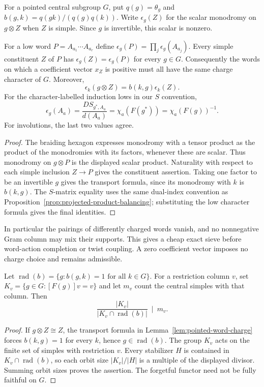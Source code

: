For a pointed central subgroup $G$, put $q(g)=\theta_g$ and
$b(g,k)=q(gk)/(q(g)q(k))$. Write $\epsilon_g(Z)$ for the scalar
monodromy on $g\otimes Z$ when $Z$ is simple. Since $g$ is invertible,
this scalar is nonzero.

\begin{lemma}
\label{lem:pointed-word-charge}
For a low word $P=A_{a_1}\cdots A_{a_r}$ define
$\epsilon_g(P)=\prod_j\epsilon_g(A_{a_j})$.
Every simple constituent $Z$ of $P$ has
$\epsilon_g(Z)=\epsilon_g(P)$ for every $g\in G$.
Consequently the words on which a coefficient vector $x_Z$ is positive
must all have the same charge character of $G$.
Moreover,
\[
 \epsilon_k(g\otimes Z)=b(k,g)\epsilon_k(Z).
\]
For the character-labelled induction lows in our $S$ convention,
\[
 \epsilon_g(A_a)=\frac{D S_{g^*,A_a}}{d(A_a)}
 =\chi_a(F(g^*))=\chi_a(F(g))^{-1}.
\]
For involutions, the last two values agree.
\end{lemma}
\begin{proof}
The braiding hexagon expresses monodromy with a tensor product as the
product of the monodromies with its factors, whenever these are scalar.
Thus monodromy on $g\otimes P$ is the displayed scalar product.
Naturality with respect to each simple inclusion $Z\to P$ gives the
constituent assertion. Taking one factor to be an invertible $g$ gives
the transport formula, since its monodromy with $k$ is $b(k,g)$.
The $S$-matrix equality uses the same dual-index convention as
Proposition~\ref{prop:projected-product-balancing}; substituting the low
character formula gives the final identities.
\end{proof}

In particular the pairings of differently charged words vanish, and no
nonnegative Gram column may mix their supports. This gives a cheap
exact sieve before word-action completion or twist coupling. A zero
coefficient vector imposes no charge choice and remains admissible.

\begin{proposition}
\label{prop:pointed-stabilizer-divisibility}
Let $\operatorname{rad}(b)=\{g:b(g,k)=1\text{ for all }k\in G\}$.
For a restriction column $v$, set
$K_v=\{g\in G:[F(g)]v=v\}$ and let $m_v$ count the central simples
with that column. Then
\[
 \frac{|K_v|}{|K_v\cap\operatorname{rad}(b)|}\ \mid\ m_v.
\]
\end{proposition}
\begin{proof}
If $g\otimes Z\cong Z$, the transport formula in
Lemma~\ref{lem:pointed-word-charge} forces $b(k,g)=1$ for every $k$,
hence $g\in\operatorname{rad}(b)$.
The group $K_v$ acts on the finite set of simples with restriction $v$.
Every stabilizer $H$ is contained in $K_v\cap\operatorname{rad}(b)$,
so each orbit size $|K_v|/|H|$ is a multiple of the displayed divisor.
Summing orbit sizes proves the assertion. The forgetful functor need not
be fully faithful on $G$.
\end{proof}

